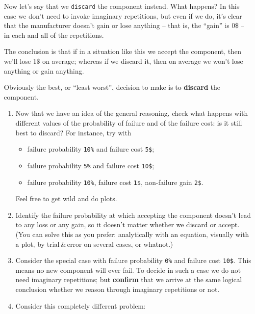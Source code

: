 \documentclass[
  a4paper,
  DIV=11,
  numbers=noendperiod,
  oneside]{scrreprt}
\providecommand{\tightlist}{%
  \setlength{\itemsep}{0pt}\setlength{\parskip}{0pt}}\usepackage{longtable,booktabs,array}
\begin{document}
Now let's say that we \texttt{discard} the component instead. What
happens? In this case we don't need to invoke imaginary repetitions, but
even if we do, it's clear that the manufacturer doesn't gain or lose
anything -- that is, the ``gain'' is \(0\$\) -- in each and all of the
repetitions.

The conclusion is that if in a situation like this we {accept} the
component, then we'll {lose \(1\$\)} on average; whereas if we {discard}
it, then on average we won't {lose anything or gain anything}.

Obviously the best, or ``least worst'', decision to make is to
\textbf{discard} the component.

\begin{tcolorbox}[enhanced jigsaw, rightrule=.15mm, colbacktitle=quarto-callout-caution-color!10!white, coltitle=black, titlerule=0mm, title={\faIcon{pen} Exercises}, colback=white, bottomrule=.15mm, toptitle=1mm, opacitybacktitle=0.6, toprule=.15mm, arc=.35mm, bottomtitle=1mm, colframe=quarto-callout-caution-color-frame, breakable, left=2mm, opacityback=0, leftrule=.75mm]

\begin{enumerate}
\def\labelenumi{\arabic{enumi}.}
\item
  Now that we have an idea of the general reasoning, check what happens
  with different values of the probability of failure and of the failure
  cost: is it still best to discard? For instance, try with

  \begin{itemize}
  \tightlist
  \item
    failure probability \texttt{10\%} and failure cost \texttt{5\$};
  \item
    failure probability \texttt{5\%} and failure cost \texttt{10\$};
  \item
    failure probability \texttt{10\%}, failure cost \texttt{1\$},
    non-failure gain \texttt{2\$}.
  \end{itemize}

  Feel free to get wild and do plots.
\item
  Identify the failure probability at which accepting the component
  doesn't lead to any loss or any gain, so it doesn't matter whether we
  discard or accept. (You can solve this as you prefer: analytically
  with an equation, visually with a plot, by trial\,\&\,error on several
  cases, or whatnot.)
\item
  Consider the special case with failure probability \texttt{0\%} and
  failure cost \texttt{10\$}. This means no new component will ever
  fail. To decide in such a case we do not need imaginary repetitions;
  but \textbf{confirm} that we arrive at the same logical conclusion
  whether we reason through imaginary repetitions or not.
\item
  Consider this completely different problem:


\end{enumerate}
\end{tcolorbox}
\end{document}
